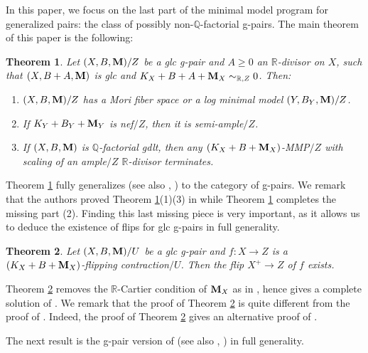 \documentclass[11pt]{amsart}
\numberwithin{equation}{section}
\newcommand{\Mm}{{\bf{M}}}
\newcommand{\Qq}{\mathbb{Q}}
\newcommand{\Rr}{\mathbb{R}}
\newtheorem{thm}{Theorem}[section]
\theoremstyle{definition}
\theoremstyle{definition}
\theoremstyle{definition}
\begin{document}
In this paper, we focus on the last part of the minimal model program for generalized pairs: the class of possibly non-$\mathbb Q$-factorial g-pairs. The main theorem of this paper is the following:
\begin{thm}\label{thm: gmm exists for g-crepant log structure}
Let $(X,B,\Mm)/Z$ be a glc g-pair and $A\geq 0$ an $\Rr$-divisor on $X$, such that $(X,B+A,\Mm)$ is glc and $K_X+B+A+\Mm_X\sim_{\Rr,Z}0$. Then:
\begin{enumerate}
    \item $(X,B,\Mm)/Z$ has a Mori fiber space or a log minimal model $(Y,B_Y,\Mm)/Z$.
    \item If $K_Y+B_Y+\Mm_Y$ is nef$/Z$, then it is semi-ample$/Z$.
    \item If $(X,B,\Mm)$ is $\Qq$-factorial gdlt, then any $(K_X+B+\Mm_X)$-MMP$/Z$ with scaling of an ample$/Z$ $\Rr$-divisor terminates.
\end{enumerate}
\end{thm}
Theorem \ref{thm: gmm exists for g-crepant log structure} fully generalizes \cite[Theorem 1.1]{Bir12}(see also \cite[Theorem 1.6]{HX13}, \cite[Theorem 1.1]{Has19}) to the category of g-pairs. We remark that the authors proved Theorem \ref{thm: gmm exists for g-crepant log structure}(1)(3) in \cite[Theorem 1.3]{LX22} while Theorem \ref{thm: gmm exists for g-crepant log structure} completes the missing part (2). Finding this last missing piece is very important, as it allows us to deduce the existence of flips for glc g-pairs in full generality.

\begin{thm}\label{thm: glc flip exists}
Let $(X,B,\Mm)/U$ be a glc g-pair and $f:X \to Z$ is a $(K_X+B+\Mm_X)$-flipping contraction$/U$. Then the flip $X^+\to Z$ of $f$ exists.
\end{thm}

Theorem \ref{thm: glc flip exists} removes the $\mathbb R$-Cartier condition of $\Mm_X$ as in \cite[Theorem 1.2]{HL21a}, hence gives a complete solution of \cite[Conjecture 3.12]{HL22}. We remark that the proof of Theorem \ref{thm: glc flip exists} is quite different from the proof of \cite[Theorem 1.2]{HL21a}. Indeed, the proof of Theorem \ref{thm: glc flip exists} gives an alternative proof of \cite[Theorem 1.2]{HL21a}.

\smallskip

The next result is the g-pair version of  \cite[Theorem 1.1]{HX13}(see also \cite[Theorem 1.4]{Bir12}, \cite[Theorem 1.1]{Has19}) in full generality. 
\end{document}
